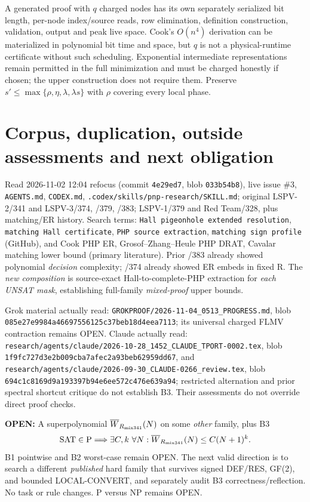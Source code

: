 \documentclass[11pt]{article}
\begin{document}
A generated proof with $q$ charged nodes has its own separately serialized bit length, per-node index/source reads, row elimination, definition construction, validation, output and peak live space. Cook's $O(n^4)$ derivation can be materialized in polynomial bit time and space, but $q$ is not a physical-runtime certificate without such scheduling. Exponential intermediate representations remain permitted in the full minimization and must be charged honestly if chosen; the upper construction does not require them. Preserve $s'\le\max\{\rho,\eta,\lambda,\lambda s\}$ with $\rho$ covering every local phase.

\section*{Corpus, duplication, outside assessments and next obligation}
Read 2026-11-02 12:04 refocus (commit \texttt{4e29ed7}, blob \texttt{033b54b8}), live issue \#3, \texttt{AGENTS.md}, \texttt{CODEX.md}, \texttt{.codex/skills/pnp-research/SKILL.md}; original LSPV-2/341 and LSPV-3/374, /379, /383; LSPV-1/379 and Red Team/328, plus matching/ER history. Search terms: \texttt{Hall pigeonhole extended resolution}, \texttt{matching Hall certificate}, \texttt{PHP source extraction}, \texttt{matching sign profile} (GitHub), and Cook PHP ER, Grosof--Zhang--Heule PHP DRAT, Cavalar matching lower bound (primary literature). Prior /383 already showed polynomial \emph{decision} complexity; /374 already showed ER embeds in fixed R. The \emph{new composition} is source-exact Hall-to-complete-PHP extraction for \emph{each UNSAT mask}, establishing full-family \emph{mixed-proof} upper bounds.

Grok material actually read: \texttt{GROKPROOF/2026-11-04_0513_PROGRESS.md}, blob \texttt{085e27e9984a46697556125c37beb18d4eea7113}; its universal charged FLMV contraction remains OPEN. Claude actually read: \texttt{research/agents/claude/2026-10-28_1452_CLAUDE_TPORT-0002.tex}, blob \texttt{1f9fc727d3e2b009cba7afec2a93beb62959dd67}, and \texttt{research/agents/claude/2026-09-30_CLAUDE-0266_review.tex}, blob \texttt{694c1c8169d9a193397b94e6ee572c476e639a94}; restricted alternation and prior spectral shortcut critique do not establish B3. Their assessments do not override direct proof checks.

\noindent\textbf{OPEN:} A superpolynomial $\overline W_{R_{\rm mix341}}(N)$ on some \emph{other} family, plus B3
\[
\mathrm{SAT}\in\mathrm P\Longrightarrow
\exists C,k\ \forall N:\overline W_{R_{\rm mix341}}(N)\le C(N+1)^k.
\]
B1 pointwise and B2 worst-case remain OPEN. The next valid direction is to search a different \emph{published} hard family that survives signed DEF/RES, GF(2), and bounded LOCAL-CONVERT, and separately audit B3 correctness/reflection. No task or rule changes. P versus NP remains OPEN.
\end{document}
